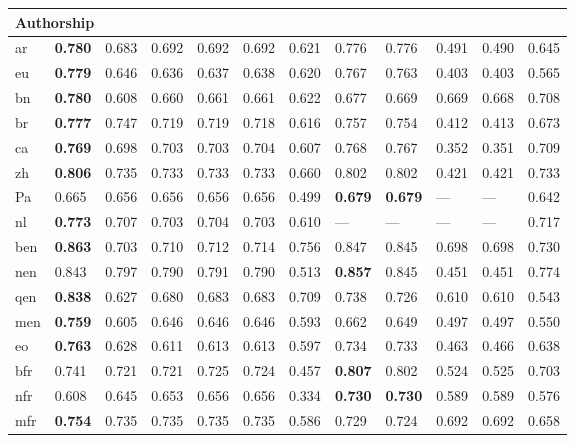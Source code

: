 \begin{longtable}{ llllllllllll }
\hline
\multicolumn{12}{|l|}{\textbf{Authorship}} \\
\hline
\textsf{ar}                   & \bf{0.780} & 0.683 & 0.692 & 0.692 & 0.692 & 0.621 & 0.776 & 0.776 & 0.491 & 0.490 & 0.645 \\
\textsf{eu}                   & \bf{0.779} & 0.646 & 0.636 & 0.637 & 0.638 & 0.620 & 0.767 & 0.763 & 0.403 & 0.403 & 0.565 \\
\textsf{bn}                   & \bf{0.780} & 0.608 & 0.660 & 0.661 & 0.661 & 0.622 & 0.677 & 0.669 & 0.669 & 0.668 & 0.708 \\
\textsf{br}                   & \bf{0.777} & 0.747 & 0.719 & 0.719 & 0.718 & 0.616 & 0.757 & 0.754 & 0.412 & 0.413 & 0.673 \\
\textsf{ca}                   & \bf{0.769} & 0.698 & 0.703 & 0.703 & 0.704 & 0.607 & 0.768 & 0.767 & 0.352 & 0.351 & 0.709 \\
\textsf{zh}                   & \bf{0.806} & 0.735 & 0.733 & 0.733 & 0.733 & 0.660 & 0.802 & 0.802 & 0.421 & 0.421 & 0.733 \\
\textsf{Pa}                   & 0.665 & 0.656 & 0.656 & 0.656 & 0.656 & 0.499 & \bf{0.679} & \bf{0.679} & --- & --- & 0.642 \\
\textsf{nl}                   & \bf{0.773} & 0.707 & 0.703 & 0.704 & 0.703 & 0.610 & --- & --- & --- & --- & 0.717 \\
\textsf{ben}                  & \bf{0.863} & 0.703 & 0.710 & 0.712 & 0.714 & 0.756 & 0.847 & 0.845 & 0.698 & 0.698 & 0.730 \\
\textsf{nen}                  & 0.843 & 0.797 & 0.790 & 0.791 & 0.790 & 0.513 & \bf{0.857} & 0.845 & 0.451 & 0.451 & 0.774 \\
\textsf{qen}                  & \bf{0.838} & 0.627 & 0.680 & 0.683 & 0.683 & 0.709 & 0.738 & 0.726 & 0.610 & 0.610 & 0.543 \\
\textsf{men}                  & \bf{0.759} & 0.605 & 0.646 & 0.646 & 0.646 & 0.593 & 0.662 & 0.649 & 0.497 & 0.497 & 0.550 \\
\textsf{eo}                   & \bf{0.763} & 0.628 & 0.611 & 0.613 & 0.613 & 0.597 & 0.734 & 0.733 & 0.463 & 0.466 & 0.638 \\
\textsf{bfr}                  & 0.741 & 0.721 & 0.721 & 0.725 & 0.724 & 0.457 & \bf{0.807} & 0.802 & 0.524 & 0.525 & 0.703 \\
\textsf{nfr}                  & 0.608 & 0.645 & 0.653 & 0.656 & 0.656 & 0.334 & \bf{0.730} & \bf{0.730} & 0.589 & 0.589 & 0.576 \\
\textsf{mfr}                  & \bf{0.754} & 0.735 & 0.735 & 0.735 & 0.735 & 0.586 & 0.729 & 0.724 & 0.692 & 0.692 & 0.658 \\

\end{longtable}
